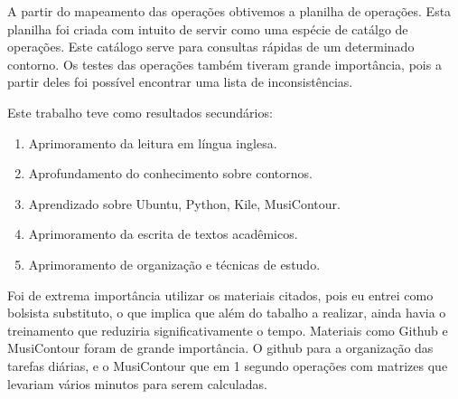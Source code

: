 \documentclass[11pt]{article}
\begin{document}
A partir do mapeamento das operações obtivemos a planilha de operações. 
Esta planilha foi criada com intuito de servir como uma espécie de 
catálgo de operações. Este catálogo serve para consultas rápidas de
um determinado contorno. Os testes das operações também tiveram grande 
importância, pois a partir deles foi possível encontrar uma lista de 
inconsistências.

Este trabalho teve como resultados secundários:

\begin{enumerate}
\item Aprimoramento da leitura em língua inglesa.
\item Aprofundamento do conhecimento sobre contornos.
\item Aprendizado sobre Ubuntu, Python, Kile, MusiContour.
\item Aprimoramento da escrita de textos acadêmicos.
\item Aprimoramento de organização e técnicas de estudo.
\end{enumerate}

\label{sec:discussao}



Foi de extrema importância utilizar os materiais citados, pois eu entrei como bolsista
substituto, o que implica que além do tabalho a realizar, ainda havia o treinamento
que reduziria significativamente o tempo. Materiais como Github e MusiContour foram de 
grande importância. O github para a organização das tarefas diárias, e o MusiContour que 
em 1 segundo operações com matrizes que levariam vários minutos para serem calculadas.
\end{document}
